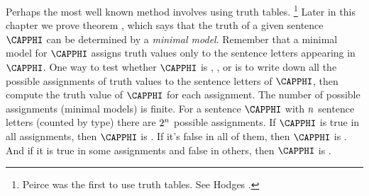 Perhaps the most well known method involves using truth tables.%
\footnote{%
	Peirce \citeyearpar{Peirce1902} was the first to use truth tables. See Hodges \citeyearpar[5]{Hodges2001}.
} 
Later in this chapter we prove theorem , which says that the truth of a given \GSL{} sentence $\CAPPHI$ can be determined by a \emph{minimal model}.
Remember that a minimal model for $\CAPPHI$ assigns truth values only to the sentence letters appearing in $\CAPPHI$.
One way to test whether $\CAPPHI$ is , , or  is to write down all the possible assignments of truth values to the sentence letters of $\CAPPHI$, then compute the truth value of $\CAPPHI$ for each assignment. 
The number of possible assignments (minimal models) is finite. 
For a sentence $\CAPPHI$ with $n$ sentence letters (counted by type) there are $2^{n}$ possible assignments. 
If $\CAPPHI$ is true in all assignments, then $\CAPPHI$ is .  
If it's false in all of them, then $\CAPPHI$ is . 
And if it is true in some assignments and false in others, then $\CAPPHI$ is . 

